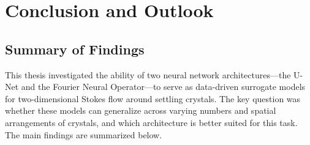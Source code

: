 %
%
%
\chapter{Conclusion and Outlook}
\label{ch:conclusions}

\section{Summary of Findings}

This thesis investigated the ability of two neural network architectures—the U-Net and the Fourier Neural Operator—to serve as data-driven surrogate models for two-dimensional Stokes flow around settling crystals. The key question was whether these models can generalize across varying numbers and spatial arrangements of crystals, and which architecture is better suited for this task. The main findings are summarized below.

